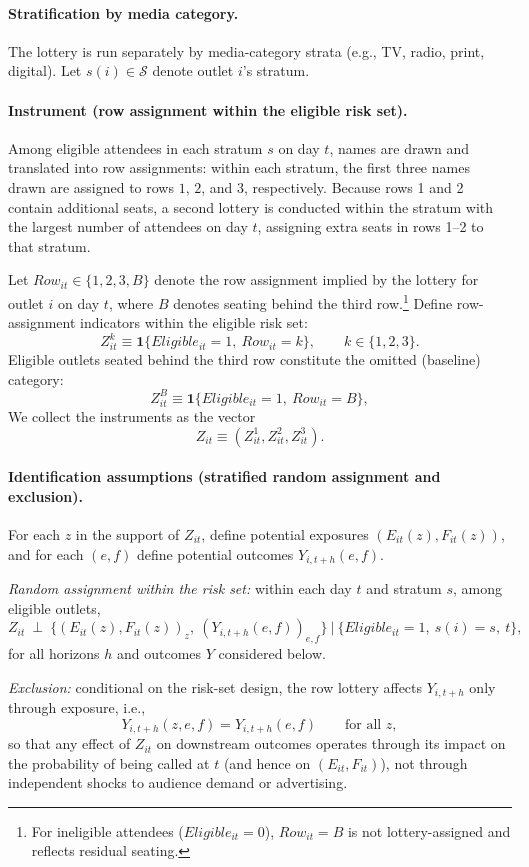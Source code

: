 \documentclass[12pt]{article}
\begin{document}
\paragraph{Stratification by media category.}
The lottery is run separately by media-category strata (e.g., TV, radio, print, digital). Let $s(i)\in\mathcal{S}$ denote outlet $i$'s stratum.

\paragraph{Instrument (row assignment within the eligible risk set).}
Among eligible attendees in each stratum $s$ on day $t$, names are drawn and translated into row assignments: within each stratum, the first three names drawn are assigned to rows $1$, $2$, and $3$, respectively. Because rows 1 and 2 contain additional seats, a second lottery is conducted within the stratum with the largest number of attendees on day $t$, assigning extra seats in rows 1--2 to that stratum.

Let $Row_{it}\in\{1,2,3,B\}$ denote the row assignment implied by the lottery for outlet $i$ on day $t$, where $B$ denotes seating behind the third row.\footnote{For ineligible attendees ($Eligible_{it}=0$), $Row_{it}=B$ is not lottery-assigned and reflects residual seating.} Define row-assignment indicators within the eligible risk set:
\[
Z^{k}_{it}\equiv \mathbf{1}\{Eligible_{it}=1,\ Row_{it}=k\},\qquad k\in\{1,2,3\}.
\]
Eligible outlets seated behind the third row constitute the omitted (baseline) category:
\[
Z^{B}_{it}\equiv \mathbf{1}\{Eligible_{it}=1,\ Row_{it}=B\},
\]
 We collect the instruments as the vector
\[
Z_{it}\equiv (Z^{1}_{it},Z^{2}_{it},Z^{3}_{it}).
\]

\paragraph{Identification assumptions (stratified random assignment and exclusion).}
For each $z$ in the support of $Z_{it}$, define potential exposures $(E_{it}(z),F_{it}(z))$, and for each $(e,f)$ define potential outcomes $Y_{i,t+h}(e,f)$.

\emph{Random assignment within the risk set:} within each day $t$ and stratum $s$, among eligible outlets,
\[
Z_{it}\ \perp\ \Big\{(E_{it}(z),F_{it}(z))_{z},\ (Y_{i,t+h}(e,f))_{e,f}\Big\}
\ \Big|\ \{Eligible_{it}=1,\ s(i)=s,\ t\},
\]
for all horizons $h$ and outcomes $Y$ considered below.

\emph{Exclusion:} conditional on the risk-set design, the row lottery affects $Y_{i,t+h}$ only through exposure, i.e.,
\[
Y_{i,t+h}(z,e,f)=Y_{i,t+h}(e,f)\qquad \text{for all }z,
\]
so that any effect of $Z_{it}$ on downstream outcomes operates through its impact on the probability of being called at $t$ (and hence on $(E_{it},F_{it})$), not through independent shocks to audience demand or advertising.
\end{document}
